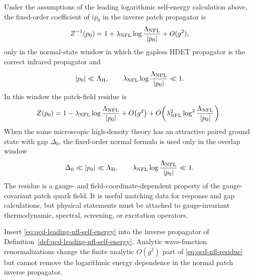 \begin{remark}
\label{rem:qcd-nfl-quark-residue}
Under the assumptions of
the leading logarithmic self-energy calculation above, the fixed-order
coefficient of \(ip_0\) in the inverse patch propagator is
\begin{equation}
  Z^{-1}(p_0)
  =
  1+\lambda_{\rm NFL}\log\frac{\Lambda_{\rm NFL}}{|p_0|}
  +O(g^2),
  \label{eq:qcd-nfl-residue}
\end{equation}
only in the normal-state window in which the gapless HDET propagator is the
correct infrared propagator and
\begin{equation}
  |p_0|\ll\Lambda_{\rm H},
  \qquad
  \lambda_{\rm NFL}\log\frac{\Lambda_{\rm NFL}}{|p_0|}\ll1 .
  \label{eq:qcd-nfl-fixed-order-window}
\end{equation}
In this window the patch-field residue is
\[
  Z(p_0)
  =
  1-\lambda_{\rm NFL}\log\frac{\Lambda_{\rm NFL}}{|p_0|}
  +O\!\left(g^2\right)
  +O\!\left(\lambda_{\rm NFL}^2
      \log^2\frac{\Lambda_{\rm NFL}}{|p_0|}\right).
\]
When the same microscopic high-density theory has an attractive paired
ground state with gap \(\Delta_0\), the fixed-order normal formula is used
only in the overlap window
\[
  \Delta_0\ll |p_0|\ll\Lambda_{\rm H},
  \qquad
  \lambda_{\rm NFL}\log\frac{\Lambda_{\rm NFL}}{|p_0|}\ll1 .
\]
The residue is a gauge- and field-coordinate-dependent property of the
gauge-covariant patch quark field.  It is useful matching data for response
and gap calculations, but physical statements must be attached to
gauge-invariant thermodynamic, spectral, screening, or excitation operators.

Insert \eqref{eq:qcd-leading-nfl-self-energy} into the inverse propagator of
Definition~\ref{def:qcd-leading-nfl-self-energy}.  Analytic wave-function
renormalizations change the finite analytic \(O(g^2)\) part of
\eqref{eq:qcd-nfl-residue} but cannot remove the logarithmic energy
dependence in the normal patch inverse propagator.


\end{remark}
